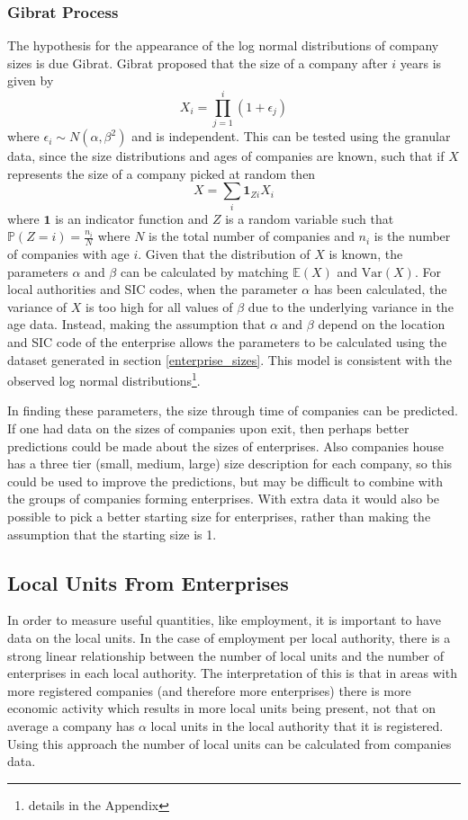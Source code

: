 \documentclass[a4paper,10pt]{article}
\begin{document}
\subsubsection{Gibrat Process}
The hypothesis for the appearance of the log normal distributions of company sizes is due Gibrat. Gibrat proposed that the size of a company after $i$ years is given by
\begin{equation}
 X_i = \prod_{j=1}^{i}(1 + \epsilon_j)
 \label{company_size}
\end{equation}
where $\epsilon_i \sim N(\alpha, \beta^2)$ and is independent. This can be tested using the granular data, since the size distributions and ages of companies are known, such that if $X$ represents the size of a company picked at random then
\begin{equation}
 X = \sum_{i}\mathbf{1}_{Zi}X_i
 \label{overall_dist}
\end{equation}
where $\mathbf{1}$ is an indicator function and $Z$ is a random variable such that $\mathbb{P}(Z = i) = \frac{n_i}{N}$ where $N$ is the total number of companies and $n_i$ is the number of companies with age $i$. Given that the distribution of $X$ is known, the parameters $\alpha$ and $\beta$ can be calculated by matching $\mathbb{E}(X)$ and $\mathrm{Var}(X)$. For local authorities and SIC codes, when the parameter $\alpha$ has been calculated, the variance of $X$ is too high for all values of $\beta$ due to the underlying variance in the age data. Instead, making the assumption that $\alpha$ and $\beta$ depend on the location and SIC code of the enterprise allows the parameters to be calculated using the dataset generated in section \ref{enterprise_sizes}. This model is consistent with the observed log normal distributions\footnote{details in the Appendix}. 

In finding these parameters, the size through time of companies can be predicted. If one had data on the sizes of companies upon exit, then perhaps better predictions could be made about the sizes of enterprises. Also companies house has a three tier (small, medium, large) size description for each company, so this could be used to improve the predictions, but may be difficult to combine with the groups of companies forming enterprises. With extra data it would also be possible to pick a better starting size for enterprises, rather than making the assumption that the starting size is 1.
\subsection{Local Units From Enterprises}
In order to measure useful quantities, like employment, it is important to have data on the local units. In the case of employment per local authority, there is a strong linear relationship between the number of local units and the number of enterprises in each local authority. The interpretation of this is that in areas with more registered companies (and therefore more enterprises) there is more economic activity which results in more local units being present, not that on average a company has $\alpha$ local units in the local authority that it is registered. %
Using this approach the number of local units can be calculated from companies data.
\end{document}
